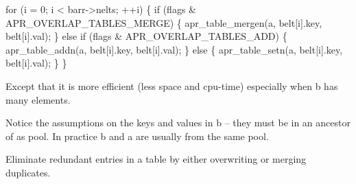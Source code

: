 \begin{DoxyPre} for (i = 0; i < barr->nelts; ++i) \{
     if (flags \& APR\_OVERLAP\_TABLES\_MERGE) \{
         apr\_table\_mergen(a, belt[i].key, belt[i].val);
     \}
     else if (flags \& APR\_OVERLAP\_TABLES\_ADD) \{
         apr\_table\_addn(a, belt[i].key, belt[i].val);
     \}
     else \{
         apr\_table\_setn(a, belt[i].key, belt[i].val);
     \}
 \}
\end{DoxyPre}


Except that it is more efficient (less space and cpu-\/time) especially when b has many elements.

Notice the assumptions on the keys and values in b -- they must be in an ancestor of a\textquotesingle{}s pool. In practice b and a are usually from the same pool.

Eliminate redundant entries in a table by either overwriting or merging duplicates.


